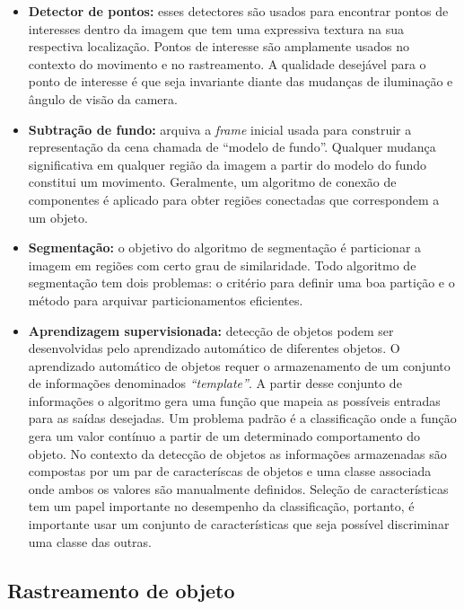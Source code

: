 	\begin{itemize}
		\item \textbf{Detector de pontos:} esses detectores são usados para encontrar pontos de interesses dentro da imagem que tem uma expressiva textura na sua respectiva localização. Pontos de interesse são amplamente usados no contexto do movimento e no rastreamento. A qualidade desejável para o ponto de interesse é que seja invariante diante das mudanças de iluminação e ângulo de visão da camera.
	
		\item \textbf{Subtração de fundo:} arquiva a \textit{frame} inicial usada para construir a representação da cena chamada de ``modelo de fundo''. Qualquer mudança significativa em qualquer região da imagem a partir do modelo do fundo constitui um movimento. Geralmente, um algoritmo de conexão de componentes é aplicado para obter regiões conectadas que correspondem a um objeto.

		\item \textbf{Segmentação:} o objetivo do algoritmo de segmentação é particionar a imagem em regiões com certo grau de similaridade. Todo algoritmo de segmentação tem dois problemas: o critério para definir uma boa partição e o método para arquivar particionamentos eficientes.

		\item \textbf{Aprendizagem supervisionada:} detecção de objetos podem ser desenvolvidas pelo aprendizado automático de diferentes objetos. O aprendizado automático de objetos requer o armazenamento de um conjunto de informações denominados \textit{``template''}. A partir desse conjunto de informações o algoritmo gera uma função que mapeia as possíveis entradas para as saídas desejadas. Um problema padrão é a classificação onde a função gera um valor contínuo a partir de um determinado comportamento do objeto. No contexto da detecção de objetos as informações armazenadas são compostas por um par de caracteríscas de objetos e uma classe associada onde ambos os valores são manualmente definidos. Seleção de características tem um papel importante no desempenho da classificação, portanto, é importante usar um conjunto de características que seja possível discriminar uma classe das outras.
	\end{itemize}

\subsection{Rastreamento de objeto}

